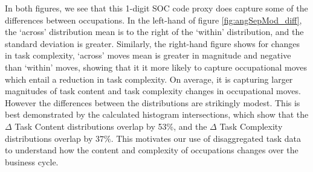 \documentclass[12pt,authoryear]{elsarticle}
\begin{document}
	In both figures, we see that this 1-digit SOC code proxy does capture some of the differences between occupations. In the left-hand of figure \ref{fig:angSepMod_diff}, the `across' distribution mean is to the right of the `within' distribution, and the standard deviation is greater. Similarly, the right-hand figure shows for changes in task complexity, `across' moves mean is greater in magnitude and negative than `within' moves, showing that it it more likely to capture occupational moves which entail a reduction in task complexity.  On average, it is capturing larger magnitudes of task content and task complexity changes in occupational moves. However the differences between the distributions are strikingly modest. This is best demonstrated by the calculated histogram intersections, which show that  the $\Delta$ Task Content distributions overlap by 53\%, and the $\Delta$ Task Complexity distributions overlap by $37\%$. This motivates our use of disaggregated task data to understand how the content and complexity of occupations changes over the business cycle. 
	
	
	\begin{comment}
	\begin{figure}[H]
	\centering
	\begin{minipage}{.5\textwidth}
	\centering
	\texttt{[image: ../Figures/all\_diff1Digit\_nonzero]}
	\end{minipage}%
	\begin{minipage}{.5\textwidth}
	\centering
	\texttt{[image: ../Figures/all\_same1Digit\_nonzero]}
	\end{minipage}%
	\caption{$\Delta$Task Content and $\Delta$Task Complexity of potential occupational moves across (left) and within (right) 1-digit SOC codes (excluding zeros)}
	\label{fig:angSep_diff}
	\end{figure}
	\end{comment}
	
	
	
	
	
	
	
	
	
\end{document}
